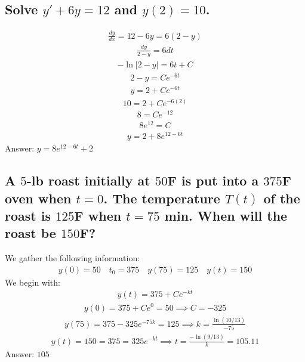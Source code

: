 \documentclass{article}
\begin{document}
\subsection{Solve $y' + 6y = 12$ and $y(2)=10$.}
\begin{align*}
	\frac{dy}{dx} = 12 - 6y = 6 (2 - y)
\end{align*}
\begin{align*}
	\frac{dy}{2 - y} = 6dt
\end{align*}
\begin{align*}
	-\ln{|2 - y|} = 6t + C
\end{align*}
\begin{align*}
	2 - y = Ce^{-6t}
\end{align*}
\begin{align*}
	y = 2 + Ce^{-6t}
\end{align*}
\begin{align*}
	10 = 2 + Ce^{-6(2)}
\end{align*}
\begin{align*}
	8 = Ce^{-12}
\end{align*}
\begin{align*}
	8e^{12} = C
\end{align*}
\begin{align*}
	y = 2 + 8e^{12 - 6t}
\end{align*}
Answer: $y = 8e^{12 - 6t} + 2$

\subsection{A $5$-lb roast initially at $50$F is put into a $375$F oven when $t = 0$. The temperature $T(t)$ of the roast is $125$F when $t = 75$ min. When will the roast be $150$F?}
We gather the following information:
\begin{align*}
	y(0) = 50 \quad t_0 = 375 \quad y(75) = 125 \quad y(t) = 150
\end{align*}
We begin with:
\begin{align*}
	y(t) = 375 + Ce^{-kt}
\end{align*}
\begin{align*}
	y(0) = 375 + Ce^0 = 50 \implies C = -325
\end{align*}
\begin{align*}
	y(75) = 375 - 325e^{-75k} = 125 \implies k = \frac{\ln{(10/13)}}{-75}
\end{align*}
\begin{align*}
	y(t) = 150 = 375 = 325e^{-kt} \implies t = \frac{-\ln{(9/13)}}{k} = 105.11
\end{align*}
Answer: $105$
\end{document}
